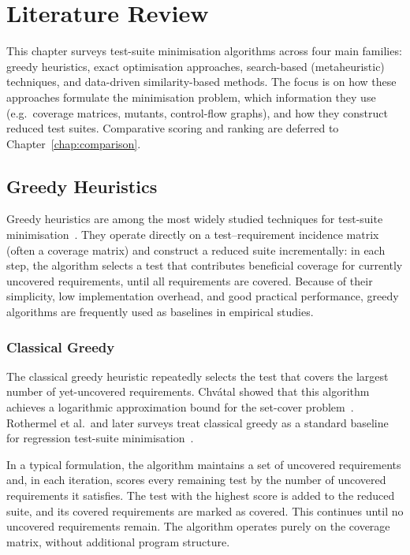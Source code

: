 \chapter{Literature Review}\label{chap:literature-review}

This chapter surveys test-suite minimisation algorithms across four main families:
greedy heuristics, exact optimisation approaches, search-based (metaheuristic) techniques,
and data-driven similarity-based methods. The focus is on how these approaches
formulate the minimisation problem, which information they use (e.g.\ coverage matrices,
mutants, control-flow graphs), and how they construct reduced test suites.
Comparative scoring and ranking are deferred to Chapter~\ref{chap:comparison}.


\section{Greedy Heuristics}

Greedy heuristics are among the most widely studied techniques for test-suite
minimisation~\cite{yoo2012,noemmer2020}. They operate directly on a
test--requirement incidence matrix (often a coverage matrix) and construct a reduced
suite incrementally: in each step, the algorithm selects a test that contributes
beneficial coverage for currently uncovered requirements, until all requirements are
covered. Because of their simplicity, low implementation overhead, and good practical
performance, greedy algorithms are frequently used as baselines in empirical studies.

\subsection{Classical Greedy}

The classical greedy heuristic repeatedly selects the test that covers the largest
number of yet-uncovered requirements. Chvátal showed that this algorithm achieves
a logarithmic approximation bound for the set-cover problem~\cite{chvatal1979}.
Rothermel et al.\ and later surveys treat classical greedy as a standard baseline
for regression test-suite minimisation~\cite{rothermel1998,yoo2012}.

In a typical formulation, the algorithm maintains a set of uncovered requirements
and, in each iteration, scores every remaining test by the number of uncovered
requirements it satisfies. The test with the highest score is added to the reduced
suite, and its covered requirements are marked as covered. This continues until no
uncovered requirements remain. The algorithm operates purely on the coverage matrix,
without additional program structure.

